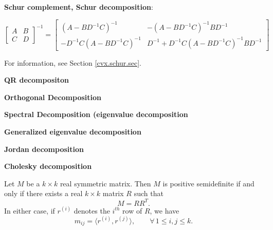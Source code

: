 \textbf{Schur complement, Schur decomposition}: 

\begin{proposition}

\[
\begin{bmatrix}
A & B \\
C & D 
\end{bmatrix}^{-1} = 
\begin{bmatrix}
(A - B D^{-1}C)^{-1} & -(A - BD^{-1}C)^{-1}BD^{-1} \\
-D^{-1}C(A - BD^{-1}C)^{-1} & D^{-1} + D^{-1}C(A - BD^{-1}C)^{-1}BD^{-1}
\end{bmatrix}
\]

\end{proposition}

For information, see Section \ref{cvx.schur.sec}.



\textbf{QR decompositon}

\textbf{Orthogonal Decomposition}

\textbf{Spectral Decomposition (eigenvalue decomposition}

\textbf{Generalized eigenvalue decomposition}

\textbf{Jordan decomposition}

\textbf{Cholesky decomposition}

\begin{theorem}\label{linalg.cholesky.proof}
Let $M$ be a $k\times k$ real symmetric matrix.  Then $M$ is positive semidefinite if and only if there exists a real $k\times k$ matrix $R$ such that
$$M=RR^{T}.$$
In either case, if $r^{(i)}$ denotes the $i^{th}$ row of $R$, we have
$$m_{ij}=\langle r^{(i)},r^{(j)}\rangle,\qquad\forall\,1\leq i,j\leq k.$$

\end{theorem}


